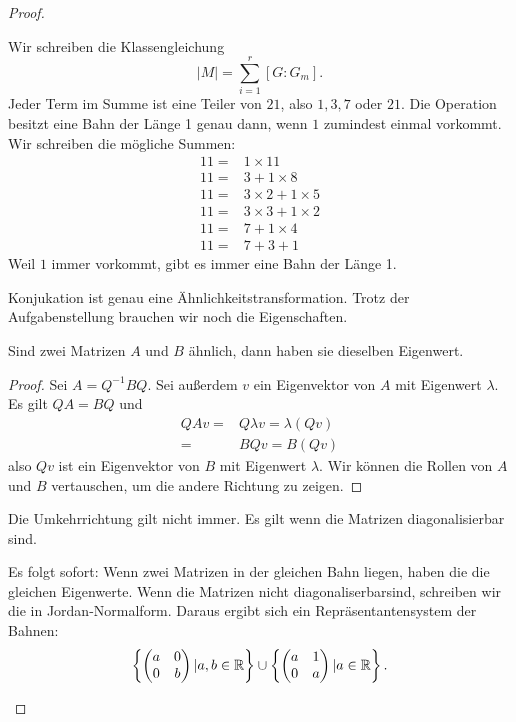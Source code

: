 \begin{proof}
	\begin{parts}
	\item Wir schreiben die Klassengleichung
		\[
			|M|=\sum_{i=1}^r [G:G_m]
		.\] 
		Jeder Term im Summe ist eine Teiler von $21$, also $1,3,7$ oder $21$. Die Operation besitzt eine Bahn der Länge 1 genau dann, wenn $1$ zumindest einmal vorkommt. Wir schreiben die mögliche Summen:
	\begin{align*}
		11=&1\times 11\\
		11=&3+1\times 8\\
		11=&3\times 2+1\times 5\\
		11=&3\times 3+1\times 2\\
		11=&7+1\times 4\\
		11=&7+3+1
	\end{align*} 
	Weil $1$ immer vorkommt, gibt es immer eine Bahn der Länge 1.
	\item Konjukation ist genau eine Ähnlichkeitstransformation. Trotz der Aufgabenstellung brauchen wir noch die Eigenschaften.
		\begin{tcolorbox}
			\begin{Lemma}
			Sind zwei Matrizen $A$ und $B$ ähnlich, dann haben sie dieselben Eigenwert.	
			\end{Lemma}
			\begin{proof}
			Sei $A=Q^{-1}BQ$. Sei außerdem $v$ ein Eigenvektor von $A$ mit Eigenwert $\lambda$. Es gilt $QA=BQ$ und
		\begin{align*}
			QAv=&Q\lambda v=\lambda(Qv)\\
			=&BQv=B(Qv)
		\end{align*}
		also $Qv$ ist ein Eigenvektor von $B$ mit Eigenwert $\lambda$. Wir können die Rollen von $A$ und $B$ vertauschen, um die andere Richtung zu zeigen. 	
			\end{proof}
			\begin{Remark}
				Die Umkehrrichtung gilt nicht immer. Es gilt wenn die Matrizen diagonalisierbar sind.
			\end{Remark}
		\end{tcolorbox}
		Es folgt sofort: Wenn zwei Matrizen in der gleichen Bahn liegen, haben die die gleichen Eigenwerte. Wenn die Matrizen nicht diagonaliserbarsind, schreiben wir die in Jordan-Normalform. Daraus ergibt sich ein Repräsentantensystem der Bahnen:
		\[
			\left\{ \begin{pmatrix} a & 0 \\ 0 & b \end{pmatrix} |a,b\in \mathbb{R} \right\} \cup \left\{ \begin{pmatrix} a & 1 \\ 0 & a \end{pmatrix} |a\in \mathbb{R} \right\} 
		.\] 
	\end{parts}
\end{proof}
